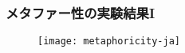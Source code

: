 \documentclass[12pt,usepdftitle=false]{beamer}
\begin{document}
%
%
%
%
%
%
%
%
%
%
%
%



\begin{frame}
    \frametitle{メタファー性の実験結果I}
    \begin{figure}[h]\centering
        \vfill
        \texttt{[image: metaphoricity-ja]}
    \end{figure}
\end{frame}
\end{document}
